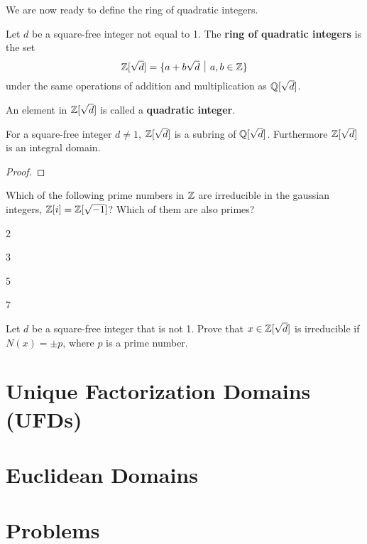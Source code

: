 We are now ready to define the ring of quadratic integers.
\begin{definition}
    Let $d$ be a square-free integer not equal to 1. The \textbf{ring of quadratic integers} is the set
    \[
        \Z[\sqrt{d}] = \{a + b\sqrt{d} \vert a,b\in\Z\}
    \]
    under the same operations of addition and multiplication as $\mathbb{Q}[\sqrt{d}]$.

    An element in $\mathbb{Z}[\sqrt{d}]$ is called a \textbf{quadratic integer}.
\end{definition}
\begin{proposition}
    For a square-free integer $d \neq 1$, $\mathbb{Z}[\sqrt{d}]$ is a subring of $\mathbb{Q}[\sqrt{d}]$. Furthermore $\mathbb{Z}[\sqrt{d}]$ is an integral domain.
\end{proposition}
\begin{proof}
\end{proof}

\begin{exercise}
    Which of the following prime numbers in $\mathbb{Z}$ are irreducible in the gaussian integers, $\mathbb{Z}[i] = \mathbb{Z}[\sqrt{-1}]$? Which of them are also primes?
    \begin{partquestions}{\alph*}
        \item 2  %
        \item 3  %
        \item 5  %
        \item 7  %
    \end{partquestions}

\end{exercise}
\begin{exercise}\label{exercise-quadratic-integer-irreducible-if-norm-is-prime}
    Let $d$ be a square-free integer that is not 1. Prove that $x \in \mathbb{Z}[\sqrt{d}]$ is irreducible if $N(x) = \pm p$, where $p$ is a prime number.
\end{exercise}


\section{Unique Factorization Domains (UFDs)}

\section{Euclidean Domains}

\newpage

\section{Problems}
